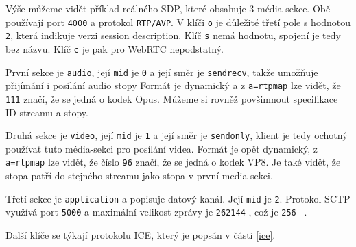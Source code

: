 Výše můžeme vidět příklad reálného SDP, které obsahuje 3 média-sekce. Obě
používají port \texttt{4000} a protokol \texttt{RTP/AVP}. V
klíči \texttt{o} je důležité třetí pole s hodnotou
\texttt{2}, která indikuje verzi session description. Klíč
\texttt{s} nemá hodnotu, spojení je tedy bez názvu. Klíč
\texttt{c} je pak pro WebRTC nepodstatný.

První sekce je \texttt{audio}, její \texttt{mid} je
\texttt{0} a její směr je \texttt{sendrecv}, takže umožňuje
přijímání i posílání audio stopy Formát je dynamický a z
\texttt{a=rtpmap} lze vidět, že \texttt{111} značí, že se
jedná o kodek Opus. Můžeme si rovněž povšimnout specifikace ID streamu a stopy.

Druhá sekce je \texttt{video}, její \texttt{mid} je
\texttt{1} a její směr je \texttt{sendonly}, klient je tedy
ochotný používat tuto média-sekci pro posílání videa. Formát je opět dynamický,
z \texttt{a=rtpmap} lze vidět, že číslo \texttt{96} značí,
že se jedná o kodek VP8. Je také vidět, že stopa patří do stejného streamu jako
stopa v první media sekci.

Třetí sekce je \texttt{application} a popisuje datový kanál. Její
\texttt{mid} je \texttt{2}. Protokol SCTP využívá port
\texttt{5000} a maximální velikost zprávy je \texttt{262144}
\si{\byte}, což je \texttt{256} \si{\kibi\byte}.

Další klíče se týkají protokolu ICE, který je popsán v části \ref{ice}.
